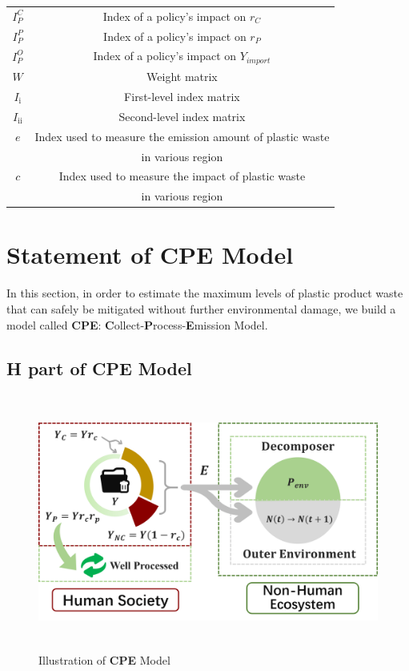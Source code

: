 \documentclass{mcmthesis}
\begin{document}
\begin{table}[H]
\begin{tabular}{cc}
			 $I_P^C$&Index of a policy's impact on $r_C$\\

			 $I_P^P$&Index of a policy's impact on $r_P$\\

			 $I_P^O$&Index of a policy's impact on $Y_{import}$\\

			\textbf{$W$}&Weight matrix\\

			\textbf{$I_{\textrm{i}}$}&First-level index matrix\\

			\textbf{$I_{\textrm{ii}}$}&Second-level index matrix\\

			$e$&Index used to measure the emission amount of plastic waste\\
			&in various region\\

			$c$&Index used to measure the impact of plastic waste\\
			&in various region\\

             \bottomrule
             \end{tabular}
           \end{table}
\section{Statement of CPE Model}
In this section, in order to estimate the maximum levels of plastic product waste that can safely be mitigated without further environmental damage, we build a model called \textbf{CPE}: \textbf{C}ollect-\textbf{P}rocess-\textbf{E}mission Model.
 
 \subsection{H part of CPE Model}
    \begin{figure}[H]
	  \centering
	  \includegraphics[width=14.65cm,height=8.42cm]{figure/CPE.png}
	  \caption{Illustration of \textbf{CPE} Model}
     \end{figure}
   
\end{document}
